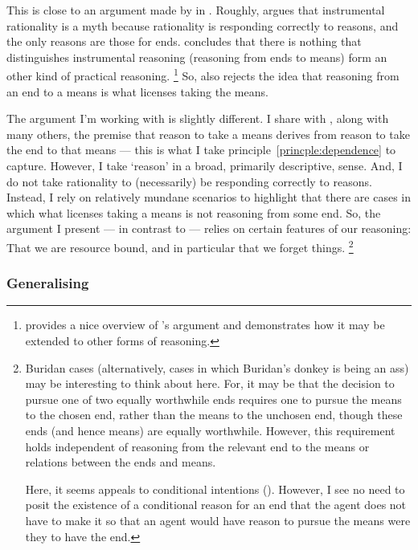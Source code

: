 \documentclass[10pt]{article}
\newcommand{\hozlinedash}[0]{%
  \noindent\hdashrule[0.5ex][c]{\textwidth}{.1pt}{2.5pt}
}
\begin{document}
This is close to an argument made by \citeauthor{Raz:2005aa} in .
Roughly, \citeauthor{Raz:2005aa} argues that instrumental rationality is a myth because rationality is responding correctly to reasons, and the only reasons are those for ends.
\citeauthor{Raz:2005aa} concludes that there is nothing that distinguishes instrumental reasoning (reasoning from ends to means) form an other kind of practical reasoning.\nolinebreak
\footnote{\citeauthor{Kolodny:2008aa} provides a nice overview of \citeauthor{Raz:2005aa}'s argument and demonstrates how it may be extended to other forms of reasoning.}
So, \citeauthor{Raz:2005aa} also rejects the idea that reasoning from an end to a means is what licenses taking the means.

The argument I’m working with is slightly different.
I share with \citeauthor{Raz:2005aa}, along with many others, the premise that reason to take a means derives from reason to take the end to that means --- this is what I take principle~\ref{princple:dependence} to capture.
However, I take `reason' in a broad, primarily descriptive, sense.
And, I do not take rationality to (necessarily) be responding correctly to reasons.
Instead, I rely on relatively mundane scenarios to highlight that there are cases in which what licenses taking a means is not reasoning from some end.
So, the argument I present --- in contrast to \citeauthor{Raz:2005aa} --- relies on certain features of our reasoning:
That we are resource bound, and in particular that we forget things.\nolinebreak
\footnote{Buridan cases (alternatively, cases in which Buridan's donkey is being an ass) may be interesting to think about here.
For, it may be that the decision to pursue one of two equally worthwhile ends requires one to pursue the means to the chosen end, rather than the means to the unchosen end, though these ends (and hence means) are equally worthwhile.
However, this requirement holds independent of reasoning from the relevant end to the means or relations between the ends and means.

Here, it seems \citeauthor{Raz:2005aa} appeals to conditional intentions (\citeyear[cf.][22]{Raz:2005aa}).
However, I see no need to posit the existence of a conditional reason for an end that the agent does not have to make it so that an agent would have reason to pursue the means were they to have the end.
}

\hozlinedash


\subsubsection*{Generalising}
\label{sec:generalising}
\end{document}
